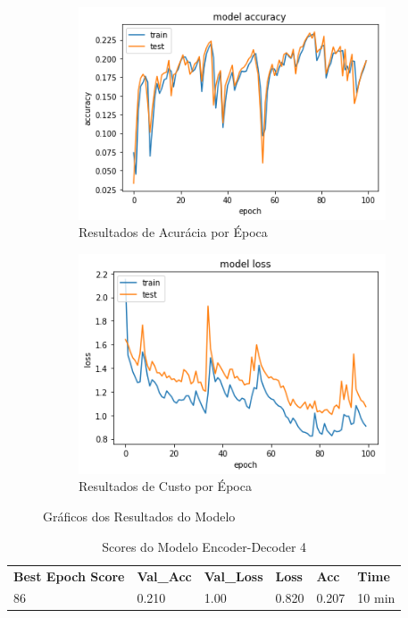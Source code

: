 \begin{figure}[H]
  \centering
  \begin{subfigure}[b]{0.45\linewidth}
    \includegraphics[width=\linewidth]{img/enc-dec-4.png}
    \caption{Resultados de Acurácia por Época}
  \end{subfigure}
  \begin{subfigure}[b]{0.45\linewidth}
    \includegraphics[width=\linewidth]{img/enc-dec-4-loss.png}
    \caption{Resultados de Custo por Época}
  \end{subfigure}
  \caption{Gráficos dos Resultados do Modelo}
  \label{fig:plots4}
\end{figure}

\begin{table}[H]
\centering
\begin{tabular}{llllll}
\textbf{Best Epoch Score} & \textbf{Val\_Acc} & \textbf{Val\_Loss} & \textbf{Loss} & \textbf{Acc} & \textbf{Time} \\
86 & 0.210 & 1.00 & 0.820 & 0.207 & 10 min
\end{tabular}
\caption{Scores do Modelo Encoder-Decoder 4}
\label{tab:res-enc-dec-4}
\end{table}

